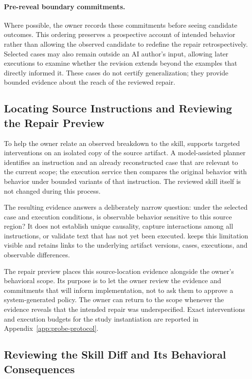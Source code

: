\paragraph{Pre-reveal boundary commitments.}
Where possible, the owner records these commitments before seeing candidate
outcomes. This ordering preserves a prospective account of intended behavior
rather than allowing the observed candidate to redefine the repair
retrospectively. Selected cases may also remain outside an AI author's input,
allowing later executions to examine whether the revision extends beyond the
examples that directly informed it. These cases do not certify generalization;
they provide bounded evidence about the reach of the reviewed repair.

\subsection{Locating Source Instructions and Reviewing the Repair Preview}
\label{sec:instruction-effects}

To help the owner relate an observed breakdown to the skill, \systemname{}
supports targeted interventions on an isolated copy of the source artifact. A
model-assisted planner identifies an instruction and an already reconstructed
case that are relevant to the current scope; the execution service then
compares the original behavior with behavior under bounded variants of that
instruction. The reviewed skill itself is not changed during this process.

The resulting evidence answers a deliberately narrow question: under the
selected case and execution conditions, is observable behavior sensitive to
this source region? It does not establish unique causality, capture
interactions among all instructions, or validate text that has not yet been
executed. \systemname{} keeps this limitation visible and retains links to the
underlying artifact versions, cases, executions, and observable differences.

The repair preview places this source-location evidence alongside the owner's
behavioral scope. Its purpose is to let the owner review the evidence and
commitments that will inform implementation, not to ask them to approve a
system-generated policy. The owner can return to the scope whenever the
evidence reveals that the intended repair was underspecified. Exact
interventions and execution budgets for the study instantiation are reported
in Appendix~\ref{app:probe-protocol}.

\subsection{Reviewing the Skill Diff and Its Behavioral Consequences}
\label{sec:candidate-review}

